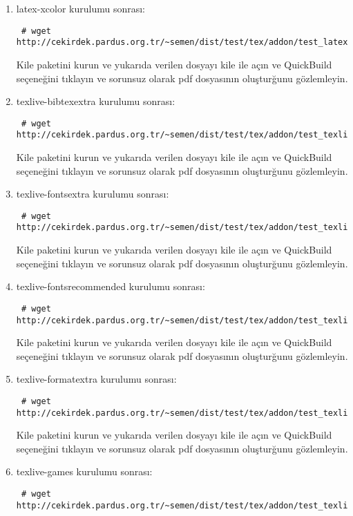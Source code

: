 \documentclass[a4paper,10pt]{article}
\begin{document}
\begin{enumerate}
\item  latex-xcolor kurulumu sonrası:
\begin{verbatim}
 # wget http://cekirdek.pardus.org.tr/~semen/dist/test/tex/addon/test_latexxcolor.tex
\end{verbatim}

Kile paketini kurun ve yukarıda verilen dosyayı kile ile açın ve QuickBuild  seçeneğini tıklayın ve sorunsuz olarak pdf dosyasının oluşturğunu gözlemleyin.

\item texlive-bibtexextra kurulumu sonrası:
\begin{verbatim}
 # wget http://cekirdek.pardus.org.tr/~semen/dist/test/tex/addon/test_texlivebibtexextra.tex
\end{verbatim}

Kile paketini kurun ve yukarıda verilen dosyayı kile ile açın ve QuickBuild  seçeneğini tıklayın ve sorunsuz olarak pdf dosyasının oluşturğunu gözlemleyin.
\item texlive-fontsextra kurulumu sonrası:
\begin{verbatim}
 # wget http://cekirdek.pardus.org.tr/~semen/dist/test/tex/addon/test_texlivefontsextra.tex
\end{verbatim}

Kile paketini kurun ve yukarıda verilen dosyayı kile ile açın ve QuickBuild  seçeneğini tıklayın ve sorunsuz olarak pdf dosyasının oluşturğunu gözlemleyin.

\item texlive-fontsrecommended kurulumu sonrası:
\begin{verbatim}
 # wget http://cekirdek.pardus.org.tr/~semen/dist/test/tex/addon/test_texlivefontsrecommended.tex
\end{verbatim}

Kile paketini kurun ve yukarıda verilen dosyayı kile ile açın ve QuickBuild  seçeneğini tıklayın ve sorunsuz olarak pdf dosyasının oluşturğunu gözlemleyin.

\item texlive-formatextra kurulumu sonrası:
\begin{verbatim}
 # wget http://cekirdek.pardus.org.tr/~semen/dist/test/tex/addon/test_texliveformatsextra.tex
\end{verbatim}

Kile paketini kurun ve yukarıda verilen dosyayı kile ile açın ve QuickBuild  seçeneğini tıklayın ve sorunsuz olarak pdf dosyasının oluşturğunu gözlemleyin.

\item texlive-games kurulumu sonrası:
\begin{verbatim}
 # wget http://cekirdek.pardus.org.tr/~semen/dist/test/tex/addon/test_texlivegames.tex
\end{verbatim}


\end{enumerate}
\end{document}
